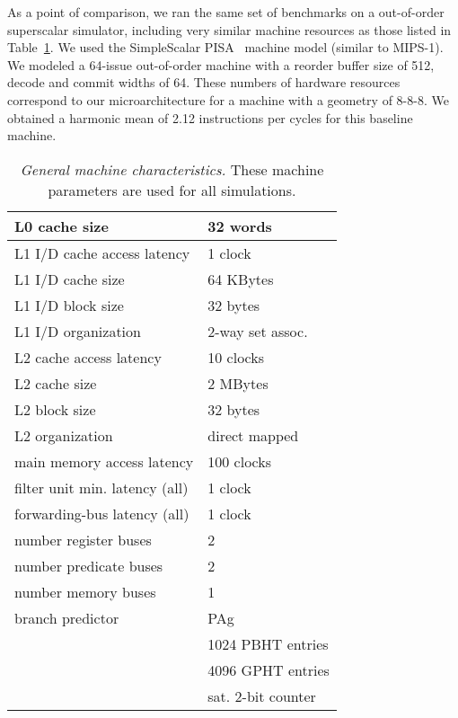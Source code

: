 \documentclass[10pt,twocolumn]{article}
\begin{document}
As a point of comparison, we ran the same set of benchmarks
on a out-of-order superscalar simulator,
including
very similar machine resources as those listed in Table~\ref{tab:params}.
We used the SimpleScalar PISA~\cite{Austin97} machine model (similar
to MIPS-1).  
We modeled a 64-issue out-of-order machine 
with a reorder buffer size of 512, decode and commit widths of 64.  
These numbers of hardware resources correspond to our microarchitecture
for a machine with a geometry of 8-8-8.
We obtained a harmonic mean of
2.12 instructions per cycles for this baseline machine.                   
%
\begin{table}
\begin{center}
\caption{{\em General machine characteristics.}
These machine parameters are used for all simulations.}
\label{tab:params}
\scriptsize{
\begin{tabular}{|l|l|}
\hline 
L0 cache size&32 words\\
\hline 
L1 I/D cache access latency&1 clock\\
\hline
L1 I/D cache size&64 KBytes\\
\hline
L1 I/D block size&32 bytes\\
\hline
L1 I/D organization&2-way set assoc.\\
\hline
L2 cache access latency&10 clocks\\
\hline
L2 cache size&2 MBytes\\
\hline
L2 block size&32 bytes\\
\hline
L2 organization&direct mapped\\
\hline
main memory access latency&100 clocks\\
\hline
filter unit min. latency (all)&1 clock\\
\hline
forwarding-bus latency (all)&1 clock\\
\hline
number register buses&2\\
\hline
number predicate buses&2\\
\hline
number memory buses&1\\
\hline
branch predictor&PAg\\
\cline{2-2}
 & 1024 PBHT entries\\
\cline{2-2}
 & 4096 GPHT entries\\
\cline{2-2}
 & sat. 2-bit counter\\
\hline 
\end{tabular}
}
\end{center}
\end{table}
%
\end{document}
